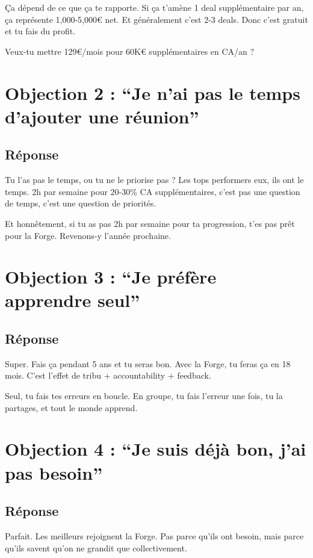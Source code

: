 \documentclass[12pt,a4paper,openany]{book}
\begin{document}
Ça dépend de ce que ça te rapporte. Si ça t'amène 1 deal supplémentaire par an, ça représente 1,000-5,000\euro{} net. Et généralement c'est 2-3 deals. Donc c'est gratuit et tu fais du profit.

Veux-tu mettre 129\euro{}/mois pour 60K\euro{} supplémentaires en CA/an ?

\section{Objection 2 : ``Je n'ai pas le temps d'ajouter une réunion''}

\subsection{Réponse}

Tu l'as pas le temps, ou tu ne le priorise pas ? Les tops performers eux, ils ont le temps. 2h par semaine pour 20-30\% CA supplémentaires, c'est pas une question de temps, c'est une question de priorités.

Et honnêtement, si tu as pas 2h par semaine pour ta progression, t'es pas prêt pour la Forge. Revenons-y l'année prochaine.

\section{Objection 3 : ``Je préfère apprendre seul''}

\subsection{Réponse}

Super. Fais ça pendant 5 ans et tu seras bon. Avec la Forge, tu feras ça en 18 mois. C'est l'effet de tribu + accountability + feedback.

Seul, tu fais tes erreurs en boucle. En groupe, tu fais l'erreur une fois, tu la partages, et tout le monde apprend.

\section{Objection 4 : ``Je suis déjà bon, j'ai pas besoin''}

\subsection{Réponse}

Parfait. Les meilleurs rejoignent la Forge. Pas parce qu'ils ont besoin, mais parce qu'ils savent qu'on ne grandit que collectivement.
\end{document}
